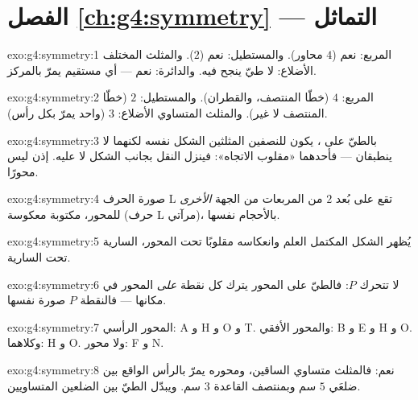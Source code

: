 \section*{الفصل \ref{ch:g4:symmetry} --- التماثل}

\begin{solution}{exo:g4:symmetry:1}
المربع: نعم ($4$ محاور). والمستطيل: نعم ($2$). والمثلث المختلف
الأضلاع: لا طيّ ينجح فيه. والدائرة: نعم --- أي مستقيم يمرّ بالمركز.
\end{solution}

\begin{solution}{exo:g4:symmetry:2}
المربع: $4$ (خطّا المنتصف، والقطران). والمستطيل: $2$ (خطّا
المنتصف لا غير). والمثلث المتساوي الأضلاع: $3$ (واحد يمرّ بكل
رأس).
\end{solution}

\begin{solution}{exo:g4:symmetry:3}
بالطيّ على ، يكون للنصفين المثلثين الشكل
نفسه لكنهما لا ينطبقان --- فأحدهما «مقلوب الاتجاه»:
فينزل النقل بجانب الشكل لا عليه. إذن  ليس
محورًا.
\end{solution}

\begin{solution}{exo:g4:symmetry:4}
صورة الحرف L تقع على بُعد $2$ من المربعات من الجهة
\emph{الأخرى} للمحور، مكتوبة معكوسة (حرف L مرآتي)، بالأحجام نفسها.
\end{solution}

\begin{solution}{exo:g4:symmetry:5}
يُظهر الشكل المكتمل العلم وانعكاسه مقلوبًا
تحت المحور، السارية تحت السارية.
\end{solution}

\begin{solution}{exo:g4:symmetry:6}
لا تتحرك $P$: فالطيّ على المحور يترك كل نقطة
\emph{على} المحور في مكانها --- فالنقطة $P$ صورة نفسها.
\end{solution}

\begin{solution}{exo:g4:symmetry:7}
المحور الرأسي: A و H و O و T. والمحور الأفقي: B و E و H و O.
وكلاهما: H و O. ولا محور: F و N.
\end{solution}

\begin{solution}{exo:g4:symmetry:8}
نعم: فالمثلث متساوي الساقين، ومحوره يمرّ بالرأس
الواقع بين ضلعَي $5$ سم وبمنتصف القاعدة $3$ سم.
ويبدّل الطيّ بين الضلعين المتساويين.
\end{solution}

